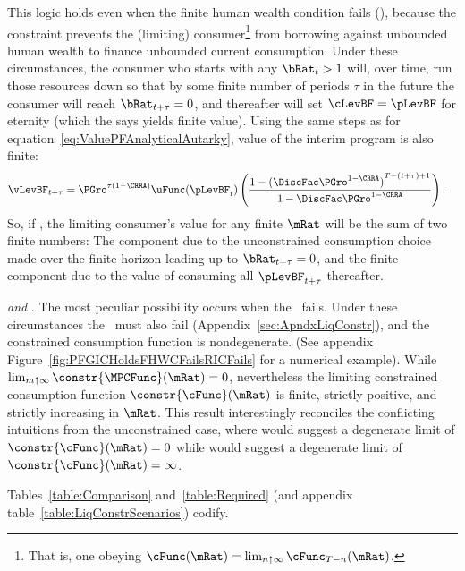 \documentclass[BufferStockTheory]{subfiles}
\begin{document}
This logic holds even when the finite human wealth condition fails (\cncl{\FHWC}), because the constraint prevents the (limiting) consumer\footnote{That is, one obeying $\cFunc(\mRat) = \lim_{n \uparrow \infty} \cFunc_{T-n}(\mRat)$.} from borrowing against unbounded human wealth to finance unbounded current consumption.  Under these circumstances, the consumer who starts with any $\bRat_{t} > 1$ will, over time, run those resources down so that by some finite number of periods $\tau$ in the future the consumer will reach $\bRat_{t+\tau} = 0$, and thereafter will set $\cLevBF = \pLevBF$ for eternity (which the {\PFFVAC} says yields finite value).  Using the same steps as for equation~\eqref{eq:ValuePFAnalyticalAutarky}, value of the interim program is also finite: \hypertarget{PFFVAC}{} \hypertarget{PFVAF}{}
\begin{align*}
  \vLevBF_{t+\tau} %
  & = \PGro^{\tau(1-\CRRA)} \uFunc(\pLevBF_{t})\left(\frac{1-{(\DiscFac \PGro^{1-\CRRA})}^{T-(t+\tau)+1}}{1-\DiscFac \PGro^{1-\CRRA}}\right).
\end{align*}
So, if \cncl{\FHWC}, the limiting consumer's value for any finite $\mRat$ will be the sum of two finite numbers: The component due to the unconstrained consumption choice made over the finite horizon leading up to $\bRat_{t+\tau} = 0$, and the finite component due to the value of consuming all $\pLevBF_{t+\tau}$ thereafter.

\hypertarget{RICandFHWCFail}{} \textit{{\GICRaw} and {\cncl{\RIC}}}.  The most peculiar possibility occurs when the \RIC~fails.  Under these circumstances the \FHWC~must also fail (Appendix~\ref{sec:ApndxLiqConstr}), and the constrained consumption function is nondegenerate.  (See appendix Figure~\ref{fig:PFGICHoldsFHWCFailsRICFails} for a numerical example).  While $\lim_{m \uparrow \infty} \constr{\MPCFunc}(\mRat) = 0$, nevertheless the limiting constrained consumption function $\constr{\cFunc}(\mRat)$ is finite, strictly positive, and strictly increasing in $\mRat$.  This result interestingly reconciles the conflicting intuitions from the unconstrained case, where \cncl{\RIC} would suggest a degenerate limit of $\constr{\cFunc}(\mRat)=0$ while \cncl{\FHWC} would suggest a degenerate limit of $\constr{\cFunc}(\mRat)=\infty$.

Tables~\ref{table:Comparison} and~\ref{table:Required} (and appendix table~\ref{table:LiqConstrScenarios}) codify.
\end{document}
